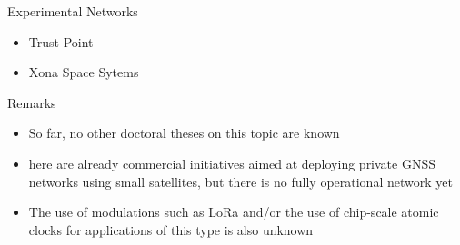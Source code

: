 \begin{frame}{Experimental Networks}

    \begin{itemize}
        \item Trust Point
        \item Xona Space Sytems
    \end{itemize}

\end{frame}

\begin{frame}{Remarks}

    \begin{itemize}
        \item So far, no other doctoral theses on this topic are known
        \vspace{0.3cm}
        \item here are already commercial initiatives aimed at deploying private GNSS networks using small satellites, but there is no fully operational network yet
        \vspace{0.3cm}
        \item The use of modulations such as LoRa and/or the use of chip-scale atomic clocks for applications of this type is also unknown
    \end{itemize}

\end{frame}
